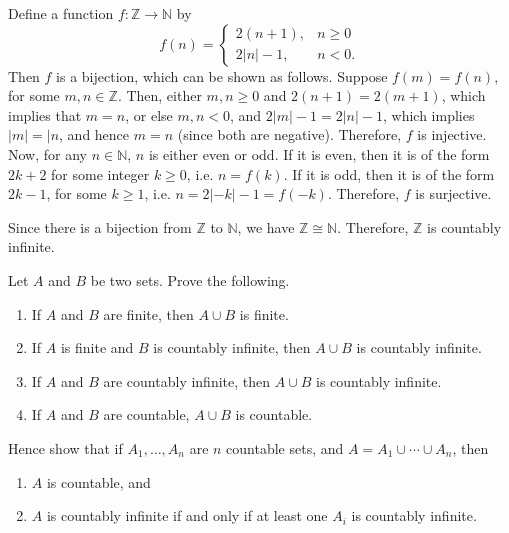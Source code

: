 \begin{Solution*}
Define a function $f \colon \mathbb Z \to \mathbb N$ by
\begin{equation*}
f(n) = \begin{cases}
2(n + 1), & n \ge 0 \\
2|n| - 1, & n < 0.
\end{cases}
\end{equation*}
Then $f$ is a bijection, which can be shown as follows. Suppose $f(m) = f(n)$, for some $m, n \in \mathbb Z$. Then, either $m, n \ge 0$ and $2(n + 1) = 2(m + 1)$, which implies that $m = n$, or else $m, n < 0$, and $2|m| - 1 = 2|n| - 1$, which implies $|m| = |n$, and hence $m = n$ (since both are negative). Therefore, $f$ is injective. Now, for any $n \in \mathbb N$, $n$ is either even or odd. If it is even, then it is of the form $2k + 2$ for some integer $k \ge 0$, i.e. $n = f(k)$. If it is odd, then it is of the form $2k - 1$, for some $k \ge 1$, i.e. $n = 2|-k| - 1 = f(-k)$. Therefore, $f$ is surjective.

Since there is a bijection from $\mathbb Z$ to $\mathbb N$, we have $\mathbb Z \cong \mathbb N$. Therefore, $\mathbb Z$ is countably infinite.
\end{Solution*}

\begin{Exercise}
Let $A$ and $B$ be two sets. Prove the following.
\begin{enumerate}
\item If $A$ and $B$ are finite, then $A \cup B$ is finite.
\item If $A$ is finite and $B$ is countably infinite, then $A \cup B$ is countably infinite.
\item If $A$ and $B$ are countably infinite, then $A \cup B$ is countably infinite.
\item If $A$ and $B$ are countable, $A \cup B$ is countable.
\end{enumerate}
Hence show that if $A_1, \ldots, A_n$ are $n$ countable sets, and $A = A_1 \cup \cdots \cup A_n$, then
\begin{enumerate}
\item $A$ is countable, and
\item $A$ is countably infinite if and only if at least one $A_i$ is countably infinite.
\end{enumerate}
\end{Exercise}

